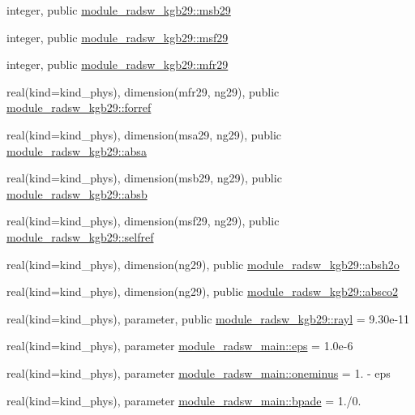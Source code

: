 \begin{DoxyCompactItemize}
\item 
integer, public \hyperlink{group__module__radsw__main_gadd8e18a273d5fa133f22fb47c4d722da}{module\+\_\+radsw\+\_\+kgb29\+::msb29}
\item 
integer, public \hyperlink{group__module__radsw__main_gace849342fcb0d18d825318a2ee26ce0e}{module\+\_\+radsw\+\_\+kgb29\+::msf29}
\item 
integer, public \hyperlink{group__module__radsw__main_ga866ce18e53b84d75d51dd8c6a999ee7b}{module\+\_\+radsw\+\_\+kgb29\+::mfr29}
\item 
real(kind=kind\+\_\+phys), dimension(mfr29, ng29), public \hyperlink{group__module__radsw__main_ga6e4d495b4588d3c794047e71497661a0}{module\+\_\+radsw\+\_\+kgb29\+::forref}
\item 
real(kind=kind\+\_\+phys), dimension(msa29, ng29), public \hyperlink{group__module__radsw__main_ga1132fd19edc0312f6bcc905619f3bdfd}{module\+\_\+radsw\+\_\+kgb29\+::absa}
\item 
real(kind=kind\+\_\+phys), dimension(msb29, ng29), public \hyperlink{group__module__radsw__main_gac9fb794bc4e4a02964b5e5d1431c31c3}{module\+\_\+radsw\+\_\+kgb29\+::absb}
\item 
real(kind=kind\+\_\+phys), dimension(msf29, ng29), public \hyperlink{group__module__radsw__main_ga468e2dd6001734d10784c8fb7b5df4e3}{module\+\_\+radsw\+\_\+kgb29\+::selfref}
\item 
real(kind=kind\+\_\+phys), dimension(ng29), public \hyperlink{group__module__radsw__main_gacab70725ca7faf002f04306fe1798e02}{module\+\_\+radsw\+\_\+kgb29\+::absh2o}
\item 
real(kind=kind\+\_\+phys), dimension(ng29), public \hyperlink{group__module__radsw__main_gaa9a57e32dfbb8979478aa8c931ff0e2d}{module\+\_\+radsw\+\_\+kgb29\+::absco2}
\item 
real(kind=kind\+\_\+phys), parameter, public \hyperlink{group__module__radsw__main_gabc0a41a10d73674e124115fe0511cc23}{module\+\_\+radsw\+\_\+kgb29\+::rayl} = 9.\+30e-\/11
\item 
real(kind=kind\+\_\+phys), parameter \hyperlink{group__module__radsw__main_ga7d311ceb7f824ea31d31ba8144751b5a}{module\+\_\+radsw\+\_\+main\+::eps} = 1.\+0e-\/6
\item 
real(kind=kind\+\_\+phys), parameter \hyperlink{group__module__radsw__main_gac666738c31ea648cae506a47e5a4e43d}{module\+\_\+radsw\+\_\+main\+::oneminus} = 1. -\/ eps
\item 
real(kind=kind\+\_\+phys), parameter \hyperlink{group__module__radsw__main_gacd9ae7c14cbfdc55f1f0fff637ca0331}{module\+\_\+radsw\+\_\+main\+::bpade} = 1./0.

\end{DoxyCompactItemize}
